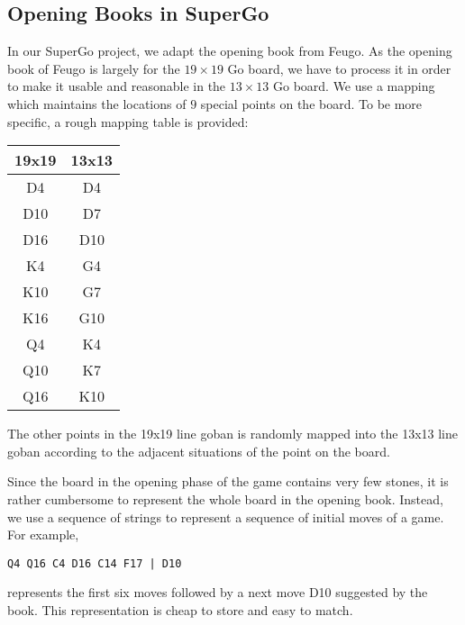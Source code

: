 \subsection{Opening Books in SuperGo}

In our SuperGo project, we adapt the opening book from Feugo. As the opening book of Feugo is largely for the $19 \times 19$ Go board, we have to process it in order to make it usable and reasonable in the $13 \times 13$ Go board. We use a mapping which maintains the locations of $9$ special points on the board. To be more specific, a rough mapping table is provided:

\begin{center}
\begin{tabular}{c|c}

19x19 & 13x13 \\ \hline
D4 & D4 \\
D10 & D7 \\
D16 & D10 \\
K4 & G4 \\
K10 & G7 \\
K16 & G10 \\
Q4 & K4 \\
Q10 & K7 \\
Q16 & K10 \\
\end{tabular}
\end{center}

The other points in the 19x19 line goban is randomly mapped into the 13x13 line goban according to the adjacent situations of the point on the board.

Since the board in the opening phase of the game contains very few stones, it is rather cumbersome to represent the whole board in the opening book\cite{lincke2002openbook}. Instead, we use a sequence of strings to represent a sequence of initial moves of a game. For example,
\begin{verbatim}
Q4 Q16 C4 D16 C14 F17 | D10
\end{verbatim}
represents the first six moves followed by a next move D10 suggested by the book. This representation is cheap to store and easy to match.
